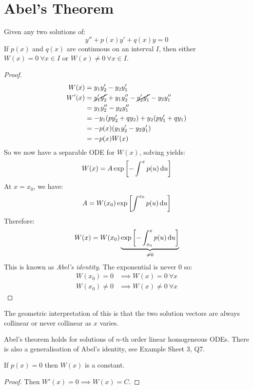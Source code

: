 \documentclass[../main.tex]{subfiles}
\begin{document}
\section{Abel's Theorem}
\begin{theorem}
  Given any two solutions of:
  \[
    y'' + p(x)y' + q(x)y = 0
  \]
  If $p(x)$ and $q(x)$ are continuous on an interval $I$, then either $W(x) = 0\ \forall x \in I$ or $W(x) \neq 0\ \forall x \in I$.
\end{theorem}
\begin{proof}
  \begin{align*}
    W(x) &= y_1 y_2' - y_2 y_1' \\
    W'(x) &= \cancel{y_1' y_2'} + y_1 y_2'' - \cancel{y_2' y_1'} - y_2 y_1'' \\
          &= y_1 y_2'' - y_2 y_1'' \\
          &= -y_1(py_2' + qy_2) + y_2(py_1' + qy_1) \\
          &= -p(x)(y_1 y_2' - y_2 y_1') \\
          &= -p(x)W(x)
  \end{align*}
  So we now have a separable ODE for $W(x)$, solving yields:
  \[
    W(x) = A\exp\left[-\int^{x} p(u) \d{u}\right]
  \]
  At $x = x_0$, we have:
  \[
    A = W(x_0)\exp\left[\int_{}^{x_0} p(u) \d{u}\right]
  \]
  Therefore:
  \[
    W(x) = W(x_0)\underbrace{\exp\left[-\int_{x_0}^{x} p(u) \d{u}\right]}_{\neq0}
  \]
  This is known as \textit{Abel's identity}.
  The exponential is never 0 so:
  \begin{align*}
    W(x_0) = 0 &\implies W(x) = 0\ \forall x \\
    W(x_0) \neq 0 &\implies W(x) \neq 0\ \forall x
  \end{align*}
\end{proof}
\begin{remark}
  The geometric interpretation of this is that the two solution vectors are always collinear or never collinear as $x$ varies.
\end{remark}
\begin{remark}[Generalisation]
  Abel's theorem holds for solutions of $n$-th order linear homogeneous ODEs.
  There is also a generalisation of Abel's identity, see Example Sheet 3, Q7.
\end{remark}
\begin{corollary}
  If $p(x) = 0$ then $W(x)$ is a constant.
\end{corollary}
\begin{proof}
  Then $W'(x) = 0 \implies W(x) = C$.
\end{proof}
\end{document}
